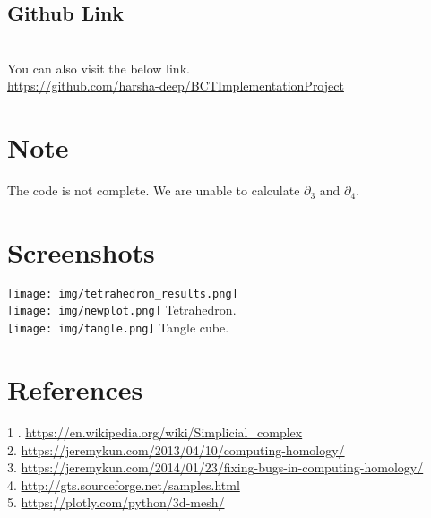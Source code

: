\documentclass[11pt]{article}
\begin{document}
\subsection{Github Link} \\
You can also visit the below link. \\
\url{https://github.com/harsha-deep/BCTImplementationProject}

\section{Note}
The code is not complete. We are unable to calculate $\partial_3$ and $\partial_4$.

\section{Screenshots}
\texttt{[image: img/tetrahedron\_results.png]} \\
\texttt{[image: img/newplot.png]}
Tetrahedron. \\
\texttt{[image: img/tangle.png]}
Tangle cube. \\

\section{References}
1 . \url{https://en.wikipedia.org/wiki/Simplicial_complex} \\
2. \url{https://jeremykun.com/2013/04/10/computing-homology/} \\
3. \url{https://jeremykun.com/2014/01/23/fixing-bugs-in-computing-homology/} \\
4. \url{http://gts.sourceforge.net/samples.html} \\
5. \url{https://plotly.com/python/3d-mesh/}
\end{document}
